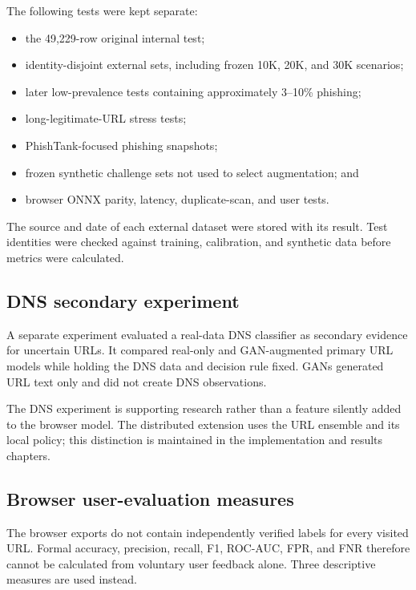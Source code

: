 The following tests were kept separate:

\begin{itemize}
    \item the 49,229-row original internal test;
    \item identity-disjoint external sets, including frozen 10K, 20K, and 30K
    scenarios;
    \item later low-prevalence tests containing approximately 3--10\% phishing;
    \item long-legitimate-URL stress tests;
    \item PhishTank-focused phishing snapshots;
    \item frozen synthetic challenge sets not used to select augmentation; and
    \item browser ONNX parity, latency, duplicate-scan, and user tests.
\end{itemize}

The source and date of each external dataset were stored with its result. Test
identities were checked against training, calibration, and synthetic data before
metrics were calculated.

\subsection{DNS secondary experiment}

A separate experiment evaluated a real-data DNS classifier as secondary
evidence for uncertain URLs. It compared real-only and GAN-augmented primary
URL models while holding the DNS data and decision rule fixed. GANs generated
URL text only and did not create DNS observations.

The DNS experiment is supporting research rather than a feature silently added
to the browser model. The distributed extension uses the URL ensemble and its
local policy; this distinction is maintained in the implementation and results
chapters.

\subsection{Browser user-evaluation measures}

The browser exports do not contain independently verified labels for every
visited URL. Formal accuracy, precision, recall, F1, ROC-AUC, FPR, and FNR
therefore cannot be calculated from voluntary user feedback alone. Three
descriptive measures are used instead.

